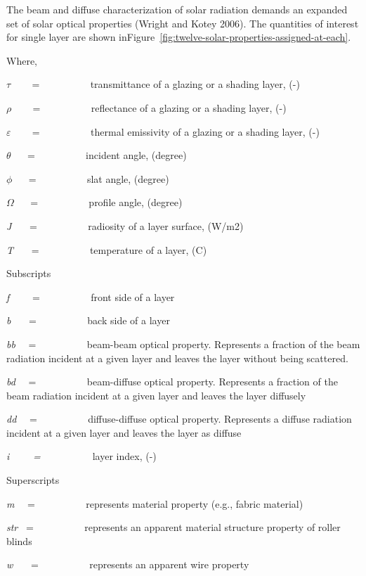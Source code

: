 The beam and diffuse characterization of solar radiation demands an expanded set of solar optical properties (Wright and Kotey 2006). The quantities of interest for single layer are shown inFigure~\ref{fig:twelve-solar-properties-assigned-at-each}.

Where,

$\tau$ ~~~ = ~~~~~~~~~ transmittance of a glazing or a shading layer, (-)

$\rho$ ~~~ = ~~~~~~~~~ reflectance of a glazing or a shading layer, (-)

$\varepsilon$ ~~~ = ~~~~~~~~~ thermal emissivity of a glazing or a shading layer, (-)

$\theta$ ~~ = ~~~~~~~~~ incident angle, (degree)

$\phi$ ~~ = ~~~~~~~~~ slat angle, (degree)

$\Omega$ ~~ = ~~~~~~~~~ profile angle, (degree)

\emph{J}~~~ = ~~~~~~~~~ radiosity of a layer surface, (W/m2)

\emph{T}~~~ = ~~~~~~~~~ temperature of a layer, (C)

Subscripts

\emph{f}~~~~ = ~~~~~~~~~ front side of a layer

\emph{b}~~~ = ~~~~~~~~~ back side of a layer

\emph{bb}~~ = ~~~~~~~~~ beam-beam optical property. Represents a fraction of the beam radiation incident at a given layer and leaves the layer without being scattered.

\emph{bd}~~ = ~~~~~~~~~ beam-diffuse optical property. Represents a fraction of the beam radiation incident at a given layer and leaves the layer diffusely

\emph{dd}~~ = ~~~~~~~~~ diffuse-diffuse optical property. Represents a diffuse radiation incident at a given layer and leaves the layer as diffuse

\emph{i~~~~ = ~~~~~~~~~} layer index, (-)

Superscripts

\emph{m}~~ = ~~~~~~~~~ represents material property (e.g., fabric material)

\emph{str}~ = ~~~~~~~~~ represents an apparent material structure property of roller blinds

\emph{w}~~~ = ~~~~~~~~~ represents an apparent wire property

